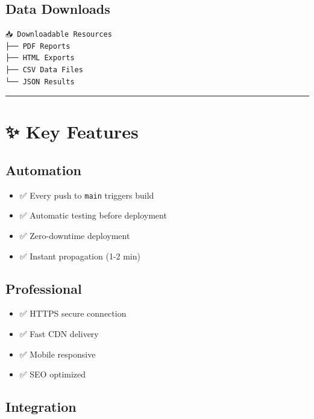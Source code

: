 \documentclass[
  11pt,
  oneside,
  openany]{scrbook}
\providecommand{\tightlist}{%
  \setlength{\itemsep}{0pt}\setlength{\parskip}{0pt}}\usepackage{longtable,booktabs,array}
\begin{document}
\section{\texorpdfstring{\textbf{Data
Downloads}}{Data Downloads}}\label{data-downloads}

\begin{verbatim}
📥 Downloadable Resources
├── PDF Reports
├── HTML Exports
├── CSV Data Files
└── JSON Results
\end{verbatim}

\begin{center}\rule{0.5\linewidth}{0.5pt}\end{center}

\chapter{✨ Key Features}\label{key-features}

\section{\texorpdfstring{\textbf{Automation}}{Automation}}\label{automation}

\begin{itemize}
\tightlist
\item
  ✅ Every push to \texttt{main} triggers build
\item
  ✅ Automatic testing before deployment
\item
  ✅ Zero-downtime deployment
\item
  ✅ Instant propagation (1-2 min)
\end{itemize}

\section{\texorpdfstring{\textbf{Professional}}{Professional}}\label{professional}

\begin{itemize}
\tightlist
\item
  ✅ HTTPS secure connection
\item
  ✅ Fast CDN delivery
\item
  ✅ Mobile responsive
\item
  ✅ SEO optimized
\end{itemize}

\section{\texorpdfstring{\textbf{Integration}}{Integration}}\label{integration}
\end{document}
